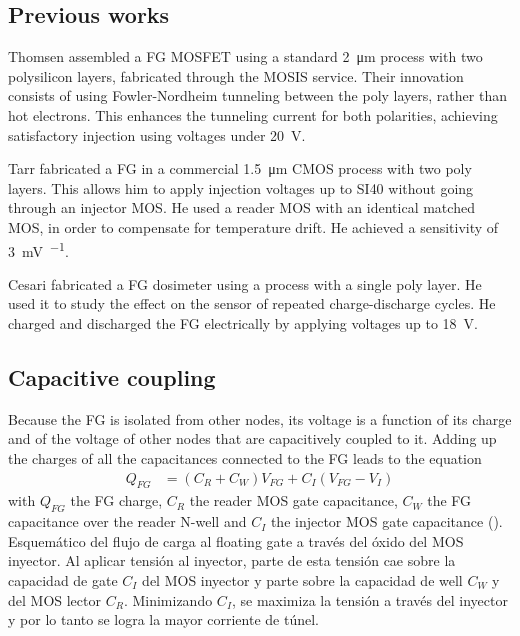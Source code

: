 \subsection{Previous works}
Thomsen\cite{thomsen_floating-gate_1991} assembled a FG MOSFET
using a standard \SI{2}{\micro\meter} process with two polysilicon layers,
fabricated through the MOSIS service\cite{noauthor_mosis_nodate}.
Their innovation consists of using Fowler-Nordheim tunneling between the poly layers,
rather than hot electrons.
This enhances the tunneling current for both polarities,
achieving satisfactory injection using voltages under \SI{20}{\volt}.

Tarr\cite{tarr_sensitive_2004} fabricated a FG in a commercial
\SI{1.5}{\micro\meter} CMOS process with two poly layers.
This allows him to apply injection voltages up to SI{40}{\volt}
without going through an injector MOS.
He used a reader MOS with an identical matched MOS,
in order to compensate for temperature drift.
He achieved a sensitivity of \SI{3}{\milli\volt\per\rad}.

Cesari\cite{cesari_floating_2014} fabricated a FG dosimeter
using a process with a single poly layer.
He used it to study the effect on the sensor of repeated charge-discharge cycles.
He charged and discharged the FG electrically by applying voltages up to
\SI{18}{\volt}.

%
\subsection{Capacitive coupling}
Because the FG is isolated from other nodes,
its voltage is a function of its charge and of the voltage of other nodes that are capacitively coupled to it.
Adding up the charges of all the capacitances connected to the FG leads to the equation
\begin{align}
    Q_{FG} &= (C_R + C_W) V_{FG} + C_I (V_{FG}-V_I)
    \label{eq:ccoupling}
\end{align}
with $Q_{FG}$ the FG charge, $C_R$ the reader MOS gate capacitance,
$C_W$ the FG capacitance over the reader N-well and 
$C_I$ the injector MOS gate capacitance ().
{Esquemático del flujo de carga al floating gate 
a través del óxido del MOS inyector.
Al aplicar tensión al inyector,
parte de esta tensión cae sobre 
la capacidad de gate $C_I$ del MOS inyector 
y parte sobre la capacidad de well $C_W$ y del MOS lector $C_R$.
Minimizando $C_I$, se maximiza la tensión a través del inyector
y por lo tanto se logra la mayor corriente de túnel.}
